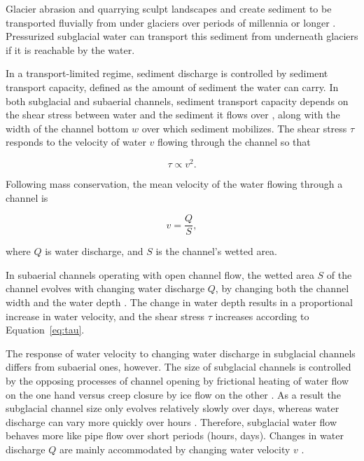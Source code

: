 \documentclass[esurf, manuscript]{copernicus}
\begin{document}
Glacier abrasion and quarrying sculpt landscapes and create sediment to be transported fluvially from under glaciers over periods of millennia or longer \citep[c.f.][]{hallet1979,iverson2012,ugelvig2018}.
Pressurized subglacial water can transport this sediment from underneath glaciers \citep{walder1994,creyts2013,beaud2018,delaney2019} if it is reachable by the water.

In a transport-limited regime, sediment discharge is controlled by sediment transport capacity, defined as the amount of sediment the water can carry.
In both subglacial and subaerial channels, sediment transport capacity depends on the shear stress between water and the sediment it flows over \citep{shields1936,meyer1948,engelund1967}, along with the width of the channel bottom $w$ over which sediment mobilizes.
The shear stress $\tau$ responds to the velocity of water $v$ flowing through the channel so that
\begin{linenomath*}
  \begin{equation}
    \label{eq:tau}
    \tau \propto v^2.
  \end{equation}
\end{linenomath*}
% 
Following mass conservation, the mean velocity of the water flowing through a  channel is
\begin{linenomath*}
  \begin{equation}
    \label{eq:v}
    v = \frac{Q}{S},
  \end{equation}
\end{linenomath*}
where $Q$ is water discharge,  and $S$ is the channel's wetted area. 

In subaerial channels operating with open channel flow, the wetted area $S$ of the channel evolves with changing water discharge $Q$, by changing both the channel width and the water depth \citep{leopold1953}.
The change in water depth results in a proportional increase in water velocity, and the shear stress $\tau$ increases according to Equation~\ref{eq:tau}.

The response of water velocity to changing water discharge in subglacial channels differs from subaerial ones, however.
The size of subglacial channels is controlled by the opposing processes of channel opening by frictional heating of water flow on the one hand versus creep closure by ice flow on the other \citep{rothlisberger1972}.
As a result  the subglacial channel size only evolves relatively slowly over days, whereas water discharge can vary more quickly over hours \citep[e.g.][]{iken1986,andrews2014,nanni2020}.
Therefore, subglacial water flow behaves more like pipe flow over short periods (hours, days).
Changes in water discharge $Q$ are mainly accommodated by changing water velocity $v$ \citep[Equation~\ref{eq:v} and Figure~\ref{fig:cartoon}; ][]{alley1997}.
\end{document}
